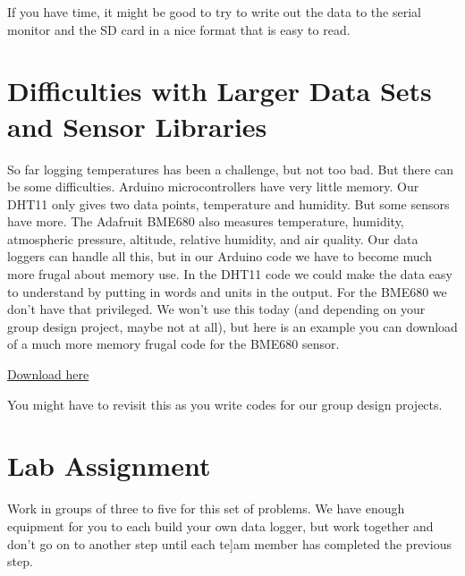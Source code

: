 If you have time, it might be good to try to write out the data to the serial monitor and the SD card in a nice format that is easy to read.

\section{Difficulties with Larger Data Sets and Sensor Libraries}
So far logging temperatures has been a challenge, but not too bad. But there can be some difficulties. Arduino microcontrollers have very little memory. Our DHT11 only gives two data points, temperature and humidity. But some sensors have more. The Adafruit BME680 also measures temperature, humidity, atmospheric pressure, altitude, relative humidity, and air quality.  Our data loggers can handle all this, but in our Arduino code we have to become much more frugal about memory use.  In the DHT11 code we could make the data easy to understand by putting in words and units in the output.  For the BME680 we don't have that privileged.  We won't use this today (and depending on your group design project, maybe not at all), but here is an example you can download of a much more memory frugal code for the BME680 sensor.

\begin{center}
\href{https://raw.githubusercontent.com/rtlines/IntermediateLabPH250/main/Code/DataLogBME680_lines.ino}{Download here}
\end{center}

\noindent You might have to revisit this as you write codes for our group design projects.


\section{Lab Assignment}
	
	Work in groups of three to five for this set of problems. We have enough equipment for you to each build your own data logger, but work together and don't go on to another step until each te]am member has completed the previous step.
	
